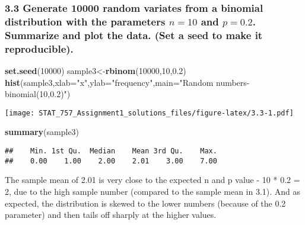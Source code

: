 \documentclass[]{article}
\newenvironment{Shaded}{\begin{snugshade}}{\end{snugshade}}
\newcommand{\DataTypeTok}[1]{\textcolor[rgb]{0.13,0.29,0.53}{#1}}
\newcommand{\DecValTok}[1]{\textcolor[rgb]{0.00,0.00,0.81}{#1}}
\newcommand{\FloatTok}[1]{\textcolor[rgb]{0.00,0.00,0.81}{#1}}
\newcommand{\KeywordTok}[1]{\textcolor[rgb]{0.13,0.29,0.53}{\textbf{#1}}}
\newcommand{\NormalTok}[1]{#1}
\newcommand{\StringTok}[1]{\textcolor[rgb]{0.31,0.60,0.02}{#1}}
\begin{document}
\hypertarget{generate-10000-random-variates-from-a-binomial-distribution-with-the-parameters-n10-and-p0.2.-summarize-and-plot-the-data.-set-a-seed-to-make-it-reproducible.}{%
\subsubsection{\texorpdfstring{3.3 Generate 10000 random variates from a
binomial distribution with the parameters \(n=10\) and \(p=0.2\).
Summarize and plot the data. (Set a seed to make it
reproducible).}{3.3 Generate 10000 random variates from a binomial distribution with the parameters n=10 and p=0.2. Summarize and plot the data. (Set a seed to make it reproducible).}}\label{generate-10000-random-variates-from-a-binomial-distribution-with-the-parameters-n10-and-p0.2.-summarize-and-plot-the-data.-set-a-seed-to-make-it-reproducible.}}

\begin{Shaded}
\begin{Highlighting}[]
\KeywordTok{set.seed}\NormalTok{(}\DecValTok{10000}\NormalTok{)}
\NormalTok{sample3<-}\KeywordTok{rbinom}\NormalTok{(}\DecValTok{10000}\NormalTok{,}\DecValTok{10}\NormalTok{,}\FloatTok{0.2}\NormalTok{)}
\KeywordTok{hist}\NormalTok{(sample3,}\DataTypeTok{xlab=}\StringTok{"x"}\NormalTok{,}\DataTypeTok{ylab=}\StringTok{"frequency"}\NormalTok{,}\DataTypeTok{main=}\StringTok{"Random numbers-binomial(10,0.2)"}\NormalTok{)}
\end{Highlighting}
\end{Shaded}

\texttt{[image: STAT\_757\_Assignment1\_solutions\_files/figure-latex/3.3-1.pdf]}

\begin{Shaded}
\begin{Highlighting}[]
\KeywordTok{summary}\NormalTok{(sample3)}
\end{Highlighting}
\end{Shaded}

\begin{verbatim}
##    Min. 1st Qu.  Median    Mean 3rd Qu.    Max. 
##    0.00    1.00    2.00    2.01    3.00    7.00
\end{verbatim}

The sample mean of 2.01 is very close to the expected n and p value - 10
* 0.2 = 2, due to the high sample number (compared to the sample mean in
3.1). And as expected, the distribution is skewed to the lower numbers
(because of the 0.2 parameter) and then tails off sharply at the higher
values.
\end{document}
